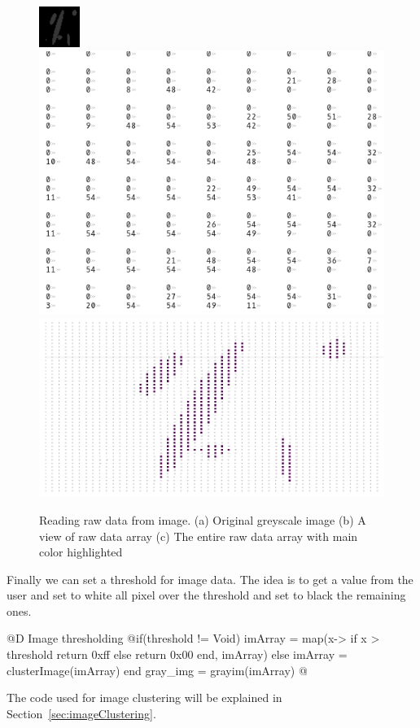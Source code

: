 \documentclass[11pt,oneside]{article}	%
\begin{document}
\begin{figure}[htb] %
   \centering
   \includegraphics[width=0.27\linewidth]{images/grayscalesample.png}
   \includegraphics[width=0.47\linewidth]{images/imArraypart.png} \\
   
   \includegraphics[width=0.67\linewidth]{images/imArrayfull.png} \hfill
   \caption{Reading raw data from image. (a) Original greyscale image (b) A view of raw data array (c) The entire raw data array with main color highlighted}
   \label{fig:rawImage}
\end{figure}

Finally we can set a threshold for image data. The idea is to get a value from the user and set to white all pixel over the threshold and set to black the remaining ones.

@D Image thresholding
@{if(threshold != Void)
  imArray = map(x-> if x > threshold return 0xff else return 0x00 end, imArray)
else
  imArray = clusterImage(imArray)
end
gray_img = grayim(imArray) @}

The code used for image clustering will be explained in Section~\ref{sec:imageClustering}. \\
\end{document}
